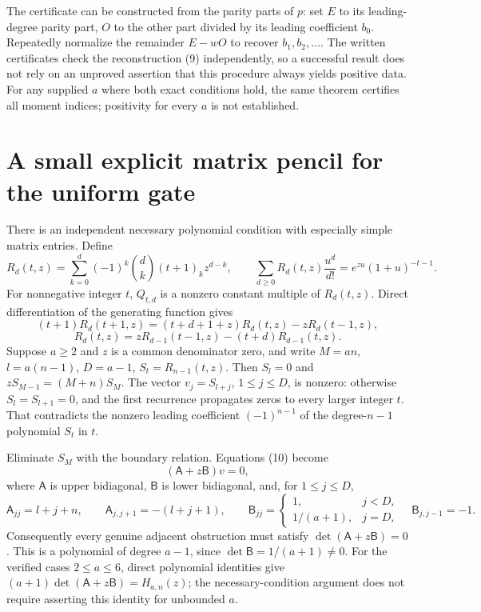 \documentclass[11pt]{article}
\begin{document}
The certificate can be constructed from the parity parts of $p$:
set $E$ to its leading-degree parity part, $O$ to the other part divided
by its leading coefficient $b_0$. Repeatedly normalize the remainder
$E-wO$ to recover $b_1,b_2,\ldots$. The written certificates check the
reconstruction (9) independently, so a successful result does not rely
on an unproved assertion that this procedure always yields positive data.
For any supplied $a$ where both exact conditions hold, the same theorem
certifies all moment indices; positivity for every $a$ is not established.

\section{A small explicit matrix pencil for the uniform gate}
There is an independent necessary polynomial condition with especially
simple matrix entries. Define
\[
 R_d(t,z)=\sum_{k=0}^d(-1)^k\binom dk(t+1)_k z^{d-k},\qquad
 \sum_{d\ge0}R_d(t,z)\frac{u^d}{d!}
              =e^{zu}(1+u)^{-t-1}.
\]
For nonnegative integer $t$, $Q_{t,d}$ is a nonzero constant multiple of
$R_d(t,z)$. Direct differentiation of the generating function gives
\[
 (t+1)R_d(t+1,z)=(t+d+1+z)R_d(t,z)-zR_d(t-1,z),
\]
\[
 R_d(t,z)=zR_{d-1}(t-1,z)-(t+d)R_{d-1}(t,z).          \tag{10}
\]
Suppose $a\ge2$ and $z$ is a common denominator zero, and write
$M=an$, $l=a(n-1)$, $D=a-1$, $S_t=R_{n-1}(t,z)$.
Then $S_l=0$ and $zS_{M-1}=(M+n)S_M$.
The vector $v_j=S_{l+j}$, $1\le j\le D$, is nonzero: otherwise
$S_l=S_{l+1}=0$, and the first recurrence propagates zeros to every
larger integer $t$. That contradicts the nonzero leading coefficient
$(-1)^{n-1}$ of the degree-$n-1$ polynomial $S_t$ in $t$.

Eliminate $S_M$ with the boundary relation. Equations (10) become
\[
                    (\mathsf A+z\mathsf B)v=0,        \tag{11}
\]
where $\mathsf A$ is upper bidiagonal, $\mathsf B$ is lower bidiagonal,
and, for $1\le j\le D$,
\[
 \mathsf A_{jj}=l+j+n,\qquad
 \mathsf A_{j,j+1}=-(l+j+1),\qquad
 \mathsf B_{jj}=\begin{cases}1,&j<D,\\1/(a+1),&j=D,\end{cases}
 \quad \mathsf B_{j,j-1}=-1.
\]
Consequently every genuine adjacent obstruction must satisfy
$\det(\mathsf A+z\mathsf B)=0$.
This is a polynomial of degree $a-1$, since
$\det\mathsf B=1/(a+1)\ne0$.
For the verified cases $2\le a\le6$, direct polynomial identities give
$(a+1)\det(\mathsf A+z\mathsf B)=H_{a,n}(z)$; the necessary-condition
argument does not require asserting this identity for unbounded $a$.
\end{document}

